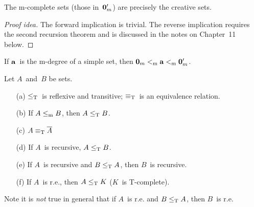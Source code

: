 \begin{thm}[Myhill]
The m-complete sets (those in~\(\mathbf{{0}}_m'\)) are precisely the creative sets.
\end{thm}
\begin{proof}[Proof idea]
The forward implication is trivial. The reverse implication requires the second recursion theorem and is discussed in the notes on Chapter~11 below.
\end{proof}

\begin{cor}
If \(\mathbf{{a}}\)~is the m-degree of a simple set, then \(\mathbf{{0}}_m\mathrel{<_{\mathrm{m}}}\mathbf{{a}}\mathrel{<_{\mathrm{m}}}\mathbf{{0}}_m'\).
\end{cor}

\begin{thm}
Let \(A\)~and~\(B\) be sets.
\begin{enumerate}[itemsep=0pt]
\item[(a)] \(\mathrel{\le_{\mathrm{T}}}\)~is reflexive and transitive; \(\mathrel{\equiv_{\mathrm{T}}}\)~is an equivalence relation.
\item[(b)] If \(A\mathrel{\le_{\mathrm{m}}} B\), then \(A\mathrel{\le_{\mathrm{T}}} B\).
\item[(c)] \(A\mathrel{\equiv_{\mathrm{T}}}\overline{A}\)
\item[(d)] If \(A\)~is recursive, \(A\mathrel{\le_{\mathrm{T}}} B\).
\item[(e)] If \(A\)~is recursive and \(B\mathrel{\le_{\mathrm{T}}} A\), then \(B\)~is recursive.
\item[(f)] If \(A\)~is r.e., then \(A\mathrel{\le_{\mathrm{T}}} K\) (\(K\)~is T-complete).
\end{enumerate}
\end{thm}
\begin{rmk}
Note it is \emph{not} true in general that if \(A\)~is r.e. and \(B\mathrel{\le_{\mathrm{T}}} A\), then \(B\)~is r.e.
\end{rmk}

